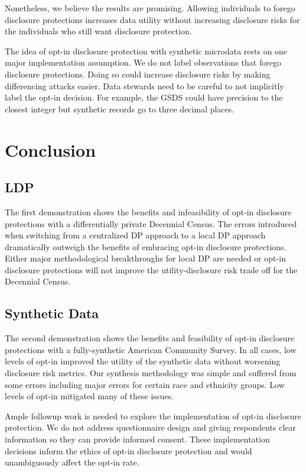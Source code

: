 \documentclass[
]{urban-formatting}
\begin{document}
Nonetheless, we believe the results are promising. Allowing individuals
to forego disclosure protections increases data utility without
increasing disclosure risks for the individuals who still want
disclosure protection.

The idea of opt-in disclosure protection with synthetic microdata rests
on one major implementation assumption. We do not label observations
that forego disclosure protections. Doing so could increase disclosure
risks by making differencing attacks easier. Data stewards need to be
careful to not implicitly label the opt-in decision. For example, the
GSDS could have precision to the closest integer but synthetic records
go to three decimal places.

\section{Conclusion}

\hypertarget{ldp}{%
\subsection{LDP}\label{ldp}}

The first demonstration shows the benefits and infeasibility of opt-in
disclosure protections with a differentially private Decennial Census.
The errors introduced when switching from a centralized DP approach to a
local DP approach dramatically outweigh the benefits of embracing opt-in
disclosure protections. Either major methodological breakthroughs for
local DP are needed or opt-in disclosure protections will not improve
the utility-disclosure risk trade off for the Decennial Census.

\hypertarget{synthetic-data}{%
\subsection{Synthetic Data}\label{synthetic-data}}

The second demonstration shows the benefits and feasibility of opt-in
disclosure protections with a fully-synthetic American Community Survey.
In all cases, low levels of opt-in improved the utility of the synthetic
data without worsening disclosure risk metrics. Our synthesis
methodology was simple and suffered from some errors including major
errors for certain race and ethnicity groups. Low levels of opt-in
mitigated many of these issues.

Ample followup work is needed to explore the implementation of opt-in
disclosure protection. We do not address questionnaire design and giving
respondents clear information so they can provide informed consent.
These implementation decisions inform the ethics of opt-in disclosure
protection and would unambiguously affect the opt-in rate.
\end{document}
